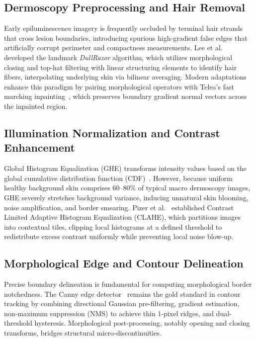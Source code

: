 \documentclass[conference]{IEEEtran}
\begin{document}
\subsection{Dermoscopy Preprocessing and Hair Removal}
Early epiluminescence imagery is frequently occluded by terminal hair strands that cross lesion boundaries, introducing spurious high-gradient false edges that artificially corrupt perimeter and compactness measurements. Lee et al.~\cite{lee1997dullrazor} developed the landmark \textit{DullRazor} algorithm, which utilizes morphological closing and top-hat filtering with linear structuring elements to identify hair fibers, interpolating underlying skin via bilinear averaging. Modern adaptations enhance this paradigm by pairing morphological operators with Telea's fast marching inpainting~\cite{telea2004image}, which preserves boundary gradient normal vectors across the inpainted region.

\subsection{Illumination Normalization and Contrast Enhancement}
Global Histogram Equalization (GHE) transforms intensity values based on the global cumulative distribution function (CDF)~\cite{gonzalez2018digital}. However, because uniform healthy background skin comprises 60--80\% of typical macro dermoscopy images, GHE severely stretches background variance, inducing unnatural skin blooming, noise amplification, and border smearing. Pizer et al.~\cite{pizer1987adaptive} established Contrast Limited Adaptive Histogram Equalization (CLAHE), which partitions images into contextual tiles, clipping local histograms at a defined threshold to redistribute excess contrast uniformly while preventing local noise blow-up.

\subsection{Morphological Edge and Contour Delineation}
Precise boundary delineation is fundamental for computing morphological border notchedness. The Canny edge detector~\cite{canny1986computational} remains the gold standard in contour tracking by combining directional Gaussian pre-filtering, gradient estimation, non-maximum suppression (NMS) to achieve thin 1-pixel ridges, and dual-threshold hysteresis. Morphological post-processing, notably opening and closing transforms, bridges structural micro-discontinuities.
\end{document}
